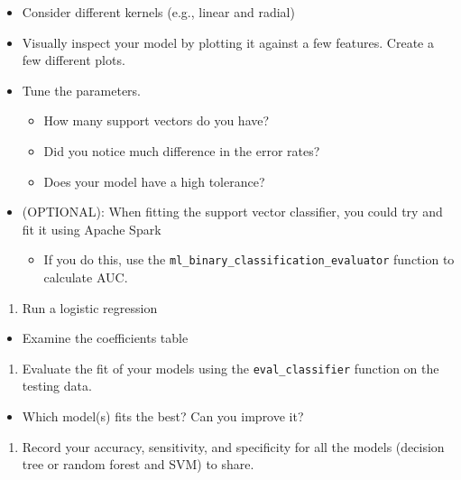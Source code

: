 \documentclass[]{book}
\providecommand{\tightlist}{%
  \setlength{\itemsep}{0pt}\setlength{\parskip}{0pt}}
\begin{document}
\begin{itemize}
\tightlist
\item
  Consider different kernels (e.g., linear and radial)
\item
  Visually inspect your model by plotting it against a few features. Create a few different plots.
\item
  Tune the parameters.

  \begin{itemize}
  \tightlist
  \item
    How many support vectors do you have?
  \item
    Did you notice much difference in the error rates?
  \item
    Does your model have a high tolerance?
  \end{itemize}
\item
  (OPTIONAL): When fitting the support vector classifier, you could try and fit it using Apache Spark

  \begin{itemize}
  \tightlist
  \item
    If you do this, use the \texttt{ml\_binary\_classification\_evaluator} function to calculate AUC.
  \end{itemize}
\end{itemize}

\begin{enumerate}
\def\labelenumi{\arabic{enumi}.}
\setcounter{enumi}{3}
\tightlist
\item
  Run a logistic regression
\end{enumerate}

\begin{itemize}
\tightlist
\item
  Examine the coefficients table
\end{itemize}

\begin{enumerate}
\def\labelenumi{\arabic{enumi}.}
\setcounter{enumi}{4}
\tightlist
\item
  Evaluate the fit of your models using the \texttt{eval\_classifier} function on the testing data.
\end{enumerate}

\begin{itemize}
\tightlist
\item
  Which model(s) fits the best? Can you improve it?
\end{itemize}

\begin{enumerate}
\def\labelenumi{\arabic{enumi}.}
\setcounter{enumi}{5}
\tightlist
\item
  Record your accuracy, sensitivity, and specificity for all the models (decision tree or random forest and SVM) to share.
\end{enumerate}
\end{document}
